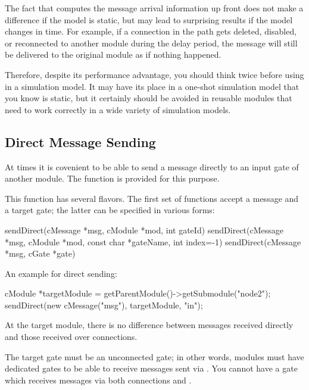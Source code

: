 \begin{note}
  The fact that  computes the message arrival
  information up front does not make a difference if the model is static,
  but may lead to surprising results if the model changes in time.
  For example, if a connection in the path gets deleted, disabled, or
  reconnected to another module during the delay period, the message
  will still be delivered to the original module as if nothing happened.

  Therefore, despite its performance advantage, you should think twice
  before using  in a simulation model. It may have
  its place in a one-shot simulation model that you know is static,
  but it certainly should be avoided in reusable modules that need to
  work correctly in a wide variety of simulation models.
\end{note}


\subsection{Direct Message Sending}
\label{sec:simple-modules:direct-sending}

At times it is covenient to be able to send a message directly to an input
gate of another module. The  function is provided for
this purpose.

This function has several flavors. The first set of 
functions accept a message and a target gate; the latter can be specified
in various forms:

\begin{cpp}
sendDirect(cMessage *msg, cModule *mod, int gateId)
sendDirect(cMessage *msg, cModule *mod, const char *gateName, int index=-1)
sendDirect(cMessage *msg, cGate *gate)
\end{cpp}

An example for direct sending:

\begin{cpp}
cModule *targetModule = getParentModule()->getSubmodule("node2");
sendDirect(new cMessage("msg"), targetModule, "in");
\end{cpp}

At the target module, there is no difference between messages received
directly and those received over connections.

The target gate must be an unconnected gate; in other words,
modules must have dedicated gates to be able to receive messages
sent via . You cannot have a gate which receives
messages via both connections and .

